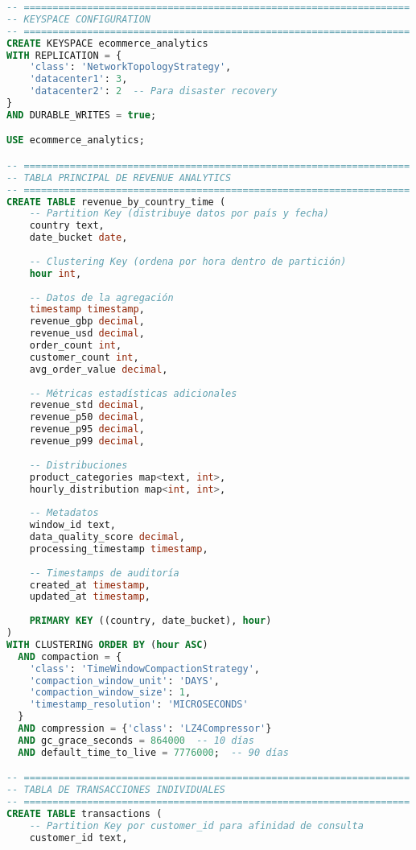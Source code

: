 \begin{lstlisting}[language=sql, caption=Definición del Keyspace y Tabla Principal de Analytics, label=lst:cassandra_schema]
-- ===================================================================
-- KEYSPACE CONFIGURATION
-- ===================================================================
CREATE KEYSPACE ecommerce_analytics 
WITH REPLICATION = {
    'class': 'NetworkTopologyStrategy',
    'datacenter1': 3,
    'datacenter2': 2  -- Para disaster recovery
} 
AND DURABLE_WRITES = true;

USE ecommerce_analytics;

-- ===================================================================
-- TABLA PRINCIPAL DE REVENUE ANALYTICS
-- ===================================================================
CREATE TABLE revenue_by_country_time (
    -- Partition Key (distribuye datos por país y fecha)
    country text,
    date_bucket date,
    
    -- Clustering Key (ordena por hora dentro de partición)
    hour int,
    
    -- Datos de la agregación
    timestamp timestamp,
    revenue_gbp decimal,
    revenue_usd decimal,
    order_count int,
    customer_count int,
    avg_order_value decimal,
    
    -- Métricas estadísticas adicionales
    revenue_std decimal,
    revenue_p50 decimal,
    revenue_p95 decimal,
    revenue_p99 decimal,
    
    -- Distribuciones
    product_categories map<text, int>,
    hourly_distribution map<int, int>,
    
    -- Metadatos
    window_id text,
    data_quality_score decimal,
    processing_timestamp timestamp,
    
    -- Timestamps de auditoría
    created_at timestamp,
    updated_at timestamp,
    
    PRIMARY KEY ((country, date_bucket), hour)
) 
WITH CLUSTERING ORDER BY (hour ASC)
  AND compaction = {
    'class': 'TimeWindowCompactionStrategy',
    'compaction_window_unit': 'DAYS',
    'compaction_window_size': 1,
    'timestamp_resolution': 'MICROSECONDS'
  }
  AND compression = {'class': 'LZ4Compressor'}
  AND gc_grace_seconds = 864000  -- 10 días
  AND default_time_to_live = 7776000;  -- 90 días

-- ===================================================================
-- TABLA DE TRANSACCIONES INDIVIDUALES
-- ===================================================================
CREATE TABLE transactions (
    -- Partition Key por customer_id para afinidad de consulta
    customer_id text,
    

\end{lstlisting}
